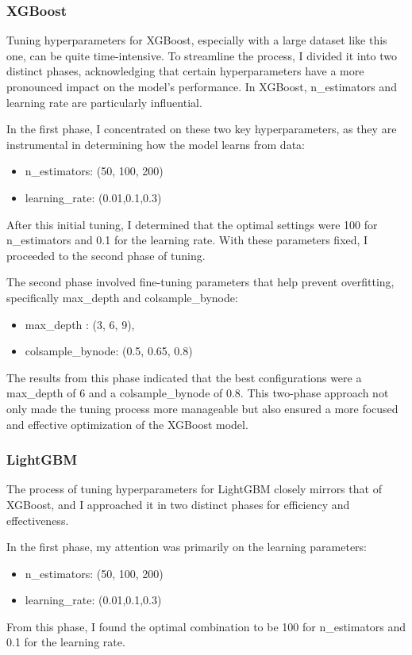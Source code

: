 \documentclass[12pt]{article}
\newtheorem{Proof of Lemma}{Proof of Lemma}
\begin{document}
\subsubsection*{XGBoost}

Tuning hyperparameters for XGBoost, especially with a large dataset like this one, can be quite time-intensive. To streamline the process, I divided it into two distinct phases, acknowledging that certain hyperparameters have a more pronounced impact on the model's performance. In XGBoost, n\_estimators and learning rate are particularly influential.

In the first phase, I concentrated on these two key hyperparameters, as they are instrumental in determining how the model learns from data:
\begin{itemize}
  \item n\_estimators:  (50, 100, 200)
  \item learning\_rate: (0.01,0.1,0.3)
\end{itemize}

After this initial tuning, I determined that the optimal settings were 100 for n\_estimators and 0.1 for the learning rate. With these parameters fixed, I proceeded to the second phase of tuning.

The second phase involved fine-tuning parameters that help prevent overfitting, specifically max\_depth and colsample\_bynode:
\begin{itemize}
  \item max\_depth : (3, 6, 9),
  \item colsample\_bynode: (0.5, 0.65, 0.8)
\end{itemize}
The results from this phase indicated that the best configurations were a max\_depth of 6 and a colsample\_bynode of 0.8. This two-phase approach not only made the tuning process more manageable but also ensured a more focused and effective optimization of the XGBoost model.

\subsubsection*{LightGBM}

The process of tuning hyperparameters for LightGBM closely mirrors that of XGBoost, and I approached it in two distinct phases for efficiency and effectiveness.

In the first phase, my attention was primarily on the learning parameters:
\begin{itemize}
  \item n\_estimators:  (50, 100, 200)
  \item learning\_rate: (0.01,0.1,0.3)
\end{itemize}
From this phase, I found the optimal combination to be 100 for n\_estimators and 0.1 for the learning rate.
\end{document}

